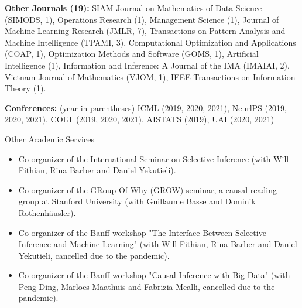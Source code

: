 \documentclass{article}
\begin{document}
\vspace{2mm}
\noindent \textbf{Other Journals (19): } SIAM Journal on Mathematics of Data Science (SIMODS, 1), Operations Research (1), Management Science (1), Journal of Machine Learning Research (JMLR, 7), Transactions on Pattern Analysis and Machine Intelligence (TPAMI, 3), Computational Optimization and Applications (COAP, 1), Optimization Methods and Software (GOMS, 1), Artificial Intelligence (1), Information and Inference: A Journal of the IMA (IMAIAI, 2), Vietnam Journal of Mathematics (VJOM, 1), IEEE Transactions on Information Theory (1).

\vspace{2mm}
\noindent \textbf{Conferences: }(year in parentheses) ICML (2019, 2020, 2021), NeurlPS (2019, 2020, 2021), COLT (2019, 2020, 2021), AISTATS (2019), UAI (2020, 2021)

\vspace{5mm}
\begin{large}
\noindent Other Academic Services
\end{large}

\begin{itemize}
\item Co-organizer of the International Seminar on Selective Inference (with Will Fithian, Rina Barber and Daniel Yekutieli).
\item Co-organizer of the GRoup-Of-Why (GROW) seminar, a causal reading group at Stanford University (with Guillaume Basse and Dominik Rothenhäusler).
\item Co-organizer of the Banff workshop "The Interface Between Selective Inference and Machine Learning" (with Will Fithian, Rina Barber and Daniel Yekutieli, cancelled due to the pandemic).
\item Co-organizer of the Banff workshop "Causal Inference with Big Data" (with Peng Ding, Marloes Maathuis and Fabrizia Mealli, cancelled due to the pandemic).
\end{itemize}
\end{document}
